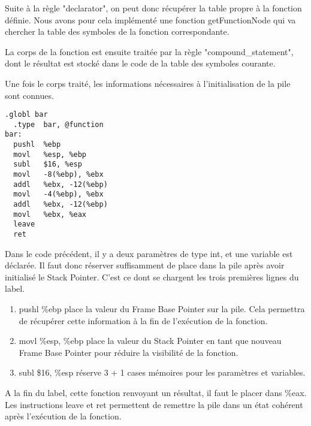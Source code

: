 \vspace{0.5cm}
Suite à la règle "declarator", on peut donc récupérer la table propre à la fonction définie. Nous avons pour cela implémenté une fonction getFunctionNode qui va chercher la table des symboles de la fonction correspondante.

\vspace{0.5cm}
La corps de la fonction est ensuite traitée par la règle "compound\_statement", dont le résultat est stocké dans le code de la table des symboles courante.

Une fois le corps traité, les informations nécessaires à l'initialisation de la pile sont connues. 

\begin{verbatim}
.globl bar               
  .type  bar, @function     
bar:        
  pushl  %ebp     
  movl   %esp, %ebp     
  subl   $16, %esp     
  movl   -8(%ebp), %ebx     
  addl   %ebx, -12(%ebp)    
  movl   -4(%ebp), %ebx     
  addl   %ebx, -12(%ebp)    
  movl   %ebx, %eax     
  leave      
  ret
\end{verbatim}

Dans le code précédent, il y a deux paramètres de type int, et une variable est déclarée. Il faut donc réserver suffisamment de place dans la pile après avoir initialisé le Stack Pointer. C'est ce dont se chargent les trois premières lignes du label.
\begin{enumerate}
\item  pushl  \%ebp place la valeur du Frame Base Pointer sur la pile. Cela permettra de récupérer cette information à la fin de l'exécution de la fonction.
\item  movl   \%esp, \%ebp place la valeur du Stack Pointer en tant que nouveau Frame Base Pointer pour réduire la visibilité de la fonction.
\item  subl   \$16, \%esp réserve 3 + 1 cases mémoires pour les paramètres et variables.
\end{enumerate}

A la fin du label, cette fonction renvoyant un résultat, il faut le placer dans \%eax. Les instructions leave et ret permettent de remettre la pile dans un état cohérent après l'exécution de la fonction.